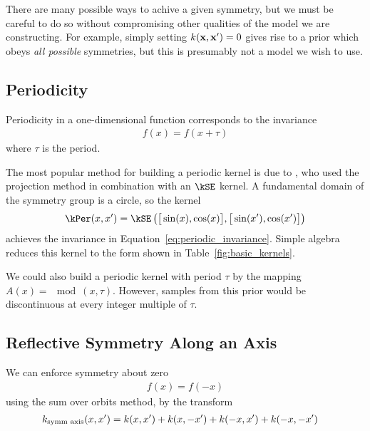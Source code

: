 There are many possible ways to achive a given symmetry, but we must be careful to do so without compromising other qualities of the model we are constructing.
For example, simply setting $k({\bf{x}}, {\bf{x}}') = 0$ gives rise to a \gp{} prior which obeys \emph{all possible} symmetries, but this is presumably not a model we wish to use.






\subsection{Periodicity}

Periodicity in a one-dimensional function corresponds to the invariance
%
\begin{align}
f(x) = f( x + \tau)
\label{eq:periodic_invariance}
\end{align}
%
where $\tau$ is the period.

The most popular method for building a periodic kernel is due to \citet{mackay1998introduction}, who used the projection method in combination with an $\kSE$ kernel.
A fundamental domain of the symmetry group is a circle, so the kernel
%
%
\begin{align}
\kPer(x, x') = \kSE \left( \big[ \sin(x), \cos(x) \big], \big[ \sin(x'), \cos(x') \big] \right)
\end{align}
%
achieves the invariance in Equation~\eqref{eq:periodic_invariance}.
Simple algebra reduces this kernel to the form shown in Table~\ref{fig:basic_kernels}.

We could also build a periodic kernel with period $\tau$ by the mapping $A(x) = \mod(x, \tau)$.
However, samples from this prior would be discontinuous at every integer multiple of $\tau$.

\subsection{Reflective Symmetry Along an Axis}

We can enforce symmetry about zero
%
\begin{align}
f(x) = f( -x)
\end{align}
%
using the sum over orbits method, by the transform
%
\begin{align}
k_{\textnormal{symm axis}}(x, x') & = k(x, x') + k(x, -x') + k(-x, x') + k(-x, -x')
\end{align}



